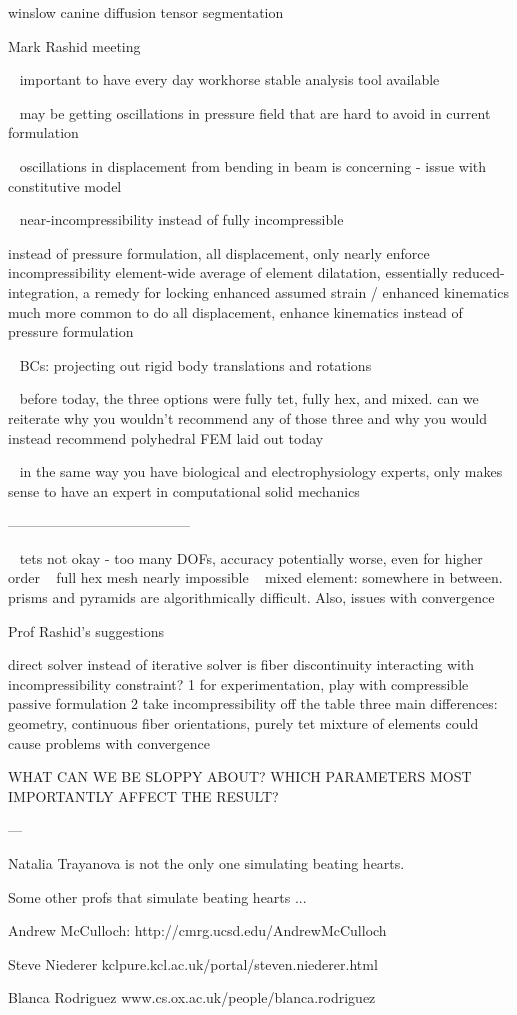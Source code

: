 winslow canine diffusion tensor segmentation


Mark Rashid meeting

~ important to have every day workhorse stable analysis tool available

~ may be getting oscillations in pressure field that are hard to avoid in current formulation

~ oscillations in displacement from bending in beam is concerning - issue with constitutive model

~ near-incompressibility instead of fully incompressible

instead of pressure formulation, all displacement, only nearly enforce incompressibility
element-wide average of element dilatation, essentially reduced-integration, a remedy for locking
enhanced assumed strain / enhanced kinematics
much more common to do all displacement, enhance kinematics instead of pressure formulation

~ BCs: projecting out rigid body translations and rotations

~ before today, the three options were fully tet, fully hex, and mixed. can we reiterate why you wouldn’t recommend any of those three and why you would instead recommend polyhedral FEM laid out today

~ in the same way you have biological and electrophysiology experts, only makes sense to have an expert in computational solid mechanics

---------------------------------------

~ tets not okay - too many DOFs, accuracy potentially worse, even for higher order
~ full hex mesh nearly impossible
~ mixed element: somewhere in between. prisms and pyramids are algorithmically difficult. Also, issues with convergence



Prof Rashid’s suggestions

direct solver instead of iterative solver
is fiber discontinuity interacting with incompressibility constraint?
1 for experimentation, play with compressible passive formulation
2 take incompressibility off the table
three main differences: geometry, continuous fiber orientations, purely tet
mixture of elements could cause problems with convergence

WHAT CAN WE BE SLOPPY ABOUT? WHICH PARAMETERS MOST IMPORTANTLY AFFECT THE RESULT?


---

Natalia Trayanova is not the only one simulating beating hearts.

Some other profs that simulate beating hearts ...

Andrew McCulloch:
http://cmrg.ucsd.edu/AndrewMcCulloch

Steve Niederer
kclpure.kcl.ac.uk/portal/steven.niederer.html

Blanca Rodriguez
www.cs.ox.ac.uk/people/blanca.rodriguez